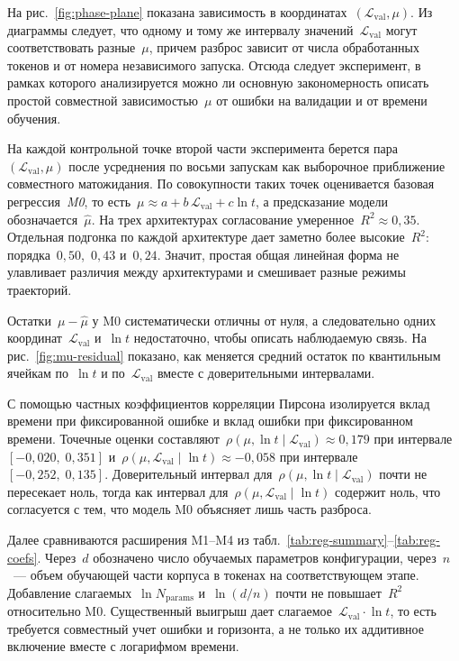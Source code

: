 \documentclass[11pt]{ubs}
\begin{document}
На рис.~\ref{fig:phase-plane} показана зависимость в координатах~$(\mathcal{L}_{\mathrm{val}},\mu)$.
Из диаграммы следует, что одному и тому же интервалу значений~$\mathcal{L}_{\mathrm{val}}$ могут соответствовать разные~$\mu$, причем разброс зависит от числа обработанных токенов и от номера независимого запуска.
Отсюда следует эксперимент, в рамках которого анализируется можно ли основную закономерность описать простой совместной зависимостью~$\mu$ от ошибки на валидации и от времени обучения.

На каждой контрольной точке второй части эксперимента берется пара~$(\mathcal{L}_{\mathrm{val}},\mu)$ после усреднения по восьми запускам как выборочное приближение совместного матожидания.
По совокупности таких точек оценивается базовая регрессия~\emph{M0}, то есть~$\mu\approx a+b\,\mathcal{L}_{\mathrm{val}}+c\ln t$, а предсказание модели обозначается~$\hat{\mu}$.
На трех архитектурах согласование умеренное~$R^2\approx 0{,}35$.
Отдельная подгонка по каждой архитектуре дает заметно более высокие~$R^2$: порядка~$0{,}50$,~$0{,}43$ и~$0{,}24$.
Значит, простая общая линейная форма не улавливает различия между архитектурами и смешивает разные режимы траекторий.

Остатки~$\mu-\hat{\mu}$ у M0 систематически отличны от нуля, а следовательно одних координат~$\mathcal{L}_{\mathrm{val}}$ и~$\ln t$ недостаточно, чтобы описать наблюдаемую связь.
На рис.~\ref{fig:mu-residual} показано, как меняется средний остаток по квантильным ячейкам по~$\ln t$ и по~$\mathcal{L}_{\mathrm{val}}$ вместе с доверительными интервалами.

С помощью частных коэффициентов корреляции Пирсона изолируется вклад времени при фиксированной ошибке и вклад ошибки при фиксированном времени.
Точечные оценки составляют~$\rho(\mu,\ln t\mid\mathcal{L}_{\mathrm{val}})\approx 0{,}179$ при интервале~$[-0{,}020,\;0{,}351]$ и~$\rho(\mu,\mathcal{L}_{\mathrm{val}}\mid\ln t)\approx -0{,}058$ при интервале~$[-0{,}252,\;0{,}135]$.
Доверительный интервал для~$\rho(\mu,\ln t\mid\mathcal{L}_{\mathrm{val}})$ почти не пересекает ноль, тогда как интервал для~$\rho(\mu,\mathcal{L}_{\mathrm{val}}\mid\ln t)$ содержит ноль, что согласуется с тем, что модель M0 объясняет лишь часть разброса.

Далее сравниваются расширения M1--M4 из табл.~\ref{tab:reg-summary}--\ref{tab:reg-coefs}.
Через~$d$ обозначено число обучаемых параметров конфигурации, через~$n$~--- объем обучающей части корпуса в токенах на соответствующем этапе.
Добавление слагаемых~$\ln N_{\mathrm{params}}$ и~$\ln(d/n)$ почти не повышает~$R^2$ относительно M0.
Существенный выигрыш дает слагаемое~$\mathcal{L}_{\mathrm{val}}\cdot\ln t$, то есть требуется совместный учет ошибки и горизонта, а не только их аддитивное включение вместе с логарифмом времени.
\end{document}

